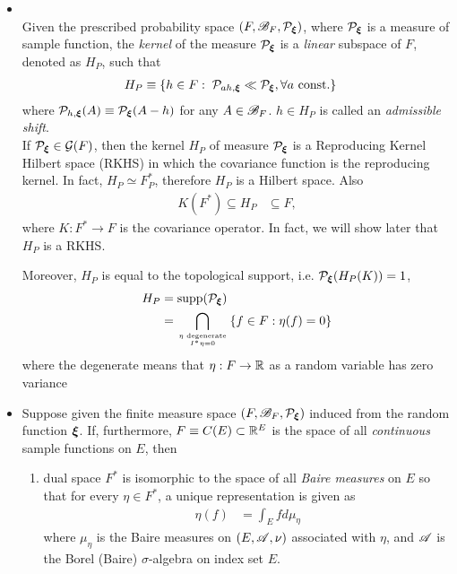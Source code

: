 \documentclass[11pt]{article}
\begin{document}
\begin{itemize}
\item \begin{definition} \citep{lifshits2013gaussian} \\
Given the prescribed probability space $(F, {\mathscr B}_{F}, {\mathcal P}_{\boldsymbol{\xi}})$, where ${\mathcal P}_{\boldsymbol{\xi}}$ is a measure of sample function, the \emph{kernel} of the measure ${\mathcal P}_{\boldsymbol{\xi}}$ is a \emph{linear} subspace of $F$, denoted as $H_{P}$, such that 
\begin{align*}
H_{P } &\equiv \left\{h\in F: \; {\mathcal P}_{ah, \boldsymbol{\xi}} \ll {\mathcal P}_{\boldsymbol{\xi}}, \forall a \text{ const.} \right\}
\end{align*} where $ {\mathcal P}_{h, \boldsymbol{\xi}}(A) \equiv {\mathcal P}_{\boldsymbol{\xi}}(A - h)$ for any $A\in {\mathscr B}_{F}$. $h\in H_{P}$ is called an \emph{admissible shift}. \\


If ${\mathcal P}_{\boldsymbol{\xi}}\in {\mathcal G}(F)$,  then the kernel $H_{P}$ of measure ${\mathcal P}_{\boldsymbol{\xi}}$ is a Reproducing Kernel Hilbert space (RKHS) in which the covariance function is the reproducing kernel. In fact, $H_{P}\simeq F_{P}^{*}$, therefore $H_{P}$ is a Hilbert space. Also
\begin{align*}
K(F^{*}) \subseteq H_{P}&  \subseteq F,
\end{align*} where $K: F^{*} \rightarrow F$ is the covariance operator. In fact, we will show later that $H_{P}$ is a RKHS.  

Moreover, $H_{P}$ is equal to the topological support, i.e. ${\mathcal P}_{\boldsymbol{\xi}}(H_{P}(K))= 1$, 
\begin{align*}
H_{P}&= \text{supp}({\mathcal P}_{\boldsymbol{\xi}})\\
&=\bigcap_{\eta \text{ degenerate}\atop I^{*}\eta=0}\left\{f\in F: \eta(f)=0\right\}
\end{align*}  where the degenerate means that $\eta: F\rightarrow {\mathbb R}$ as a random variable has zero variance \\[10pt]
\end{definition}

\item \begin{definition}
Suppose given the finite measure space $(F, {\mathscr B}_{F}, {\mathcal P}_{\boldsymbol{\xi}})$ induced from the random function $\boldsymbol{\xi}$. If, furthermore, $F\equiv C(E)\subset {\mathbb R}^{E}$ is the space of all \emph{continuous} sample functions on $E$, then
\begin{enumerate}
\item dual space $F^{*}$ is isomorphic to the space of all \emph{Baire measures} on $E$ so that for every $\eta \in F^{*}$,  a unique representation is given as 
\begin{align*}
\eta(f) &= \int_{E} f d\mu_{\eta}
\end{align*} where $\mu_{\eta}$ is the Baire measures on $(E, {\mathscr A}, \nu)$ associated with $\eta$, and ${\mathscr A}$ is the Borel (Baire) $\sigma$-algebra on index set $E$.\citep{reed1980methods, lifshits2013gaussian}\\


\end{enumerate}
\end{definition}
\end{itemize}
\end{document}
